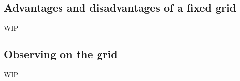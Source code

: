 \begin{colsection}
\begin{colsection}
\end{colsection}


\subsection{Advantages and disadvantages of a fixed grid}
\label{sec:fixed_grid}
\begin{colsection}

WIP

\end{colsection}


\subsection{Observing on the grid}
\label{sec:grid_observing}
\begin{colsection}

WIP

\end{colsection}


\end{colsection}


\newpage
